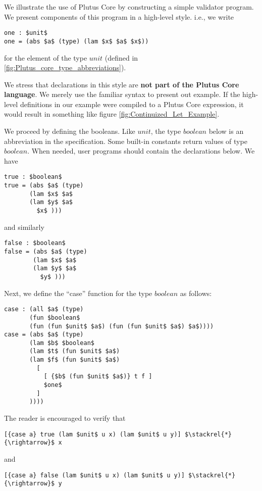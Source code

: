 \documentclass[../main.tex]{subfiles}
\begin{document}
We illustrate the use of Plutus Core by constructing a simple validator program. We present components of this program in a high-level style. i.e., we write
\begin{lstlisting}[basicstyle=\ttfamily,mathescape]
one : $unit$
one = (abs $a$ (type) (lam $x$ $a$ $x$))
\end{lstlisting}
for the element of the type $unit$ (defined in \ref{fig:Plutus_core_type_abbreviations}).

We stress that declarations in this style are \textbf{not part of the Plutus Core language}. We merely use the familiar syntax to present out example. If the high-level definitions in our example were compiled to a Plutus Core expression, it would result in something like figure \ref{fig:Continuized_Let_Example}.

We proceed by defining the booleans. Like $unit$, the type $boolean$ below is an abbreviation in the specification. Some built-in constants return values of type $boolean$. When needed, user programs should contain the declarations below. We have
\begin{lstlisting}[basicstyle=\ttfamily,mathescape]
true : $boolean$
true = (abs $a$ (type)
       (lam $x$ $a$
       (lam $y$ $a$
         $x$ )))
\end{lstlisting}
and similarly
\begin{lstlisting}[basicstyle=\ttfamily,mathescape]
false : $boolean$
false = (abs $a$ (type) 
        (lam $x$ $a$
        (lam $y$ $a$
          $y$ )))
\end{lstlisting}

Next, we define the ``case'' function for the type $boolean$ as follows:
\begin{lstlisting}[basicstyle=\ttfamily,mathescape]
case : (all $a$ (type)
       (fun $boolean$
       (fun (fun $unit$ $a$) (fun (fun $unit$ $a$) $a$))))
case = (abs $a$ (type)
       (lam $b$ $boolean$
       (lam $t$ (fun $unit$ $a$)
       (lam $f$ (fun $unit$ $a$)
         [
           [ {$b$ (fun $unit$ $a$)} t f ]
           $one$
         ] 
       ))))
\end{lstlisting}
The reader is encouraged to verify that
\begin{lstlisting}[basicstyle=\ttfamily,mathescape]
[{case a} true (lam $unit$ u x) (lam $unit$ u y)] $\stackrel{*}{\rightarrow}$ x
\end{lstlisting}  
and
\begin{lstlisting}[basicstyle=\ttfamily,mathescape]
[{case a} false (lam $unit$ u x) (lam $unit$ u y)] $\stackrel{*}{\rightarrow}$ y
\end{lstlisting}  
\end{document}

